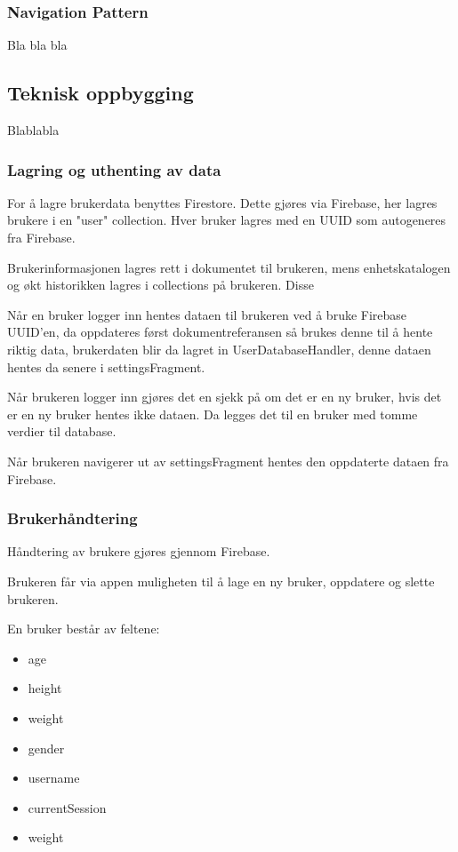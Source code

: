 \subsubsection{Navigation Pattern}
Bla bla bla

\subsection{Teknisk oppbygging}
Blablabla

\subsubsection{Lagring og uthenting av data}
For å lagre brukerdata benyttes Firestore. Dette gjøres via Firebase, her lagres brukere i en "user" collection. Hver bruker lagres med en UUID som autogeneres fra Firebase. 

Brukerinformasjonen lagres rett i dokumentet til brukeren, mens enhetskatalogen og økt historikken lagres i collections på brukeren. 
Disse 

Når en bruker logger inn hentes dataen til brukeren ved å bruke Firebase UUID'en, da oppdateres først dokumentreferansen så brukes denne til å hente riktig data, brukerdaten blir da lagret in UserDatabaseHandler, denne dataen hentes da senere i settingsFragment. 

Når brukeren logger inn gjøres det en sjekk på om det er en ny bruker, hvis det er en ny bruker hentes ikke dataen. 
Da legges det til en bruker med tomme verdier til database. 

Når brukeren navigerer ut av settingsFragment hentes den oppdaterte dataen fra Firebase.

\subsubsection{Brukerhåndtering}
Håndtering av brukere gjøres gjennom Firebase.

Brukeren får via appen muligheten til å lage en ny bruker, oppdatere og slette brukeren.

En bruker består av feltene:
\begin{itemize}
    \item age
    \item height
    \item weight
    \item gender
    \item username
    \item currentSession
    \item weight
\end{itemize}

